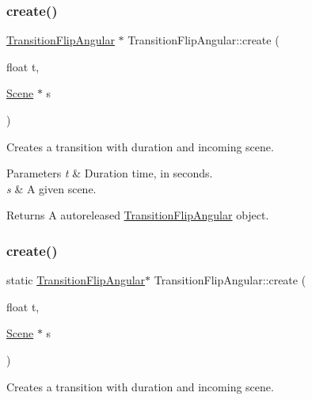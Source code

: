 \subsubsection{\texorpdfstring{create()}{create()}\hspace{0.1cm}{\footnotesize\ttfamily [3/4]}}
{\footnotesize\ttfamily \hyperlink{classTransitionFlipAngular}{Transition\+Flip\+Angular} $\ast$ Transition\+Flip\+Angular\+::create (\begin{DoxyParamCaption}\item[{float}]{t,  }\item[{\hyperlink{classScene}{Scene} $\ast$}]{s }\end{DoxyParamCaption})\hspace{0.3cm}{\ttfamily [static]}}

Creates a transition with duration and incoming scene.


\begin{DoxyParams}{Parameters}
{\em t} & Duration time, in seconds. \\
\hline
{\em s} & A given scene. \\
\hline
\end{DoxyParams}
\begin{DoxyReturn}{Returns}
A autoreleased \hyperlink{classTransitionFlipAngular}{Transition\+Flip\+Angular} object. 
\end{DoxyReturn}
\mbox{\label{classTransitionFlipAngular_a1f8852d49fc40de55a35d679ca665248}} 
\subsubsection{\texorpdfstring{create()}{create()}\hspace{0.1cm}{\footnotesize\ttfamily [4/4]}}
{\footnotesize\ttfamily static \hyperlink{classTransitionFlipAngular}{Transition\+Flip\+Angular}$\ast$ Transition\+Flip\+Angular\+::create (\begin{DoxyParamCaption}\item[{float}]{t,  }\item[{\hyperlink{classScene}{Scene} $\ast$}]{s }\end{DoxyParamCaption})\hspace{0.3cm}{\ttfamily [static]}}

Creates a transition with duration and incoming scene.


